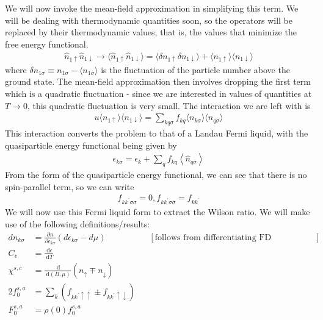 \documentclass[twoside,11pt]{report}
\numberwithin{equation}{section}
\begin{document}
We will now invoke the mean-field approximation in simplifying this term. We will be dealing with thermodynamic quantities soon, so the operators will be replaced by their thermodynamic values, that is, the values that minimize the free energy functional.
\begin{equation}\begin{aligned}
	\hat n_{1 \uparrow} \hat n_{1 \downarrow} \to \langle \hat n_{1 \uparrow} \hat n_{1 \downarrow}\rangle = \langle  \delta n_{1 \uparrow} \delta n_{1 \downarrow}\rangle + \langle  n_{1 \uparrow}\rangle\langle  n_{1 \downarrow}\rangle
\end{aligned}\end{equation}
where \(\delta n_{1\sigma} \equiv n_{1 \sigma} - \langle  n_{1\sigma} \rangle\) is the fluctuation of the particle number above the ground state. The mean-field approximation then involves dropping the first term which is a quadratic fluctuation - since we are interested in values of quantities at \( T \to 0\), this quadratic fluctuation is very small. The interaction we are left with is 
\begin{equation}\begin{aligned}
	u\langle  n_{1 \uparrow}\rangle\langle  n_{1 \downarrow}\rangle = \sum_{kq\sigma}f_{kq}\langle  n_{k \sigma}\rangle\langle  n_{q \overline\sigma}\rangle
\end{aligned}\end{equation}
This interaction converts the problem to that of a Landau Fermi liquid, with the quasiparticle energy functional being given by
\begin{equation}\begin{aligned}
	\epsilon_{k\sigma} = \epsilon_k + \sum_{q}f_{kq}\left<\hat n_{q \overline\sigma}\right>
\end{aligned}\end{equation}
From the form of the quasiparticle energy functional, we can see that there is no spin-parallel term, so we can write
\begin{equation}\begin{aligned}
	\label{rel_landau}
	f_{kk^\prime\sigma\sigma} = 0,  f_{kk^\prime\sigma\overline\sigma} = f_{kk^\prime}
\end{aligned}\end{equation}
We will now use this Fermi liquid form to extract the Wilson ratio. We will make use of the following definitions/results:
\begin{equation}\begin{aligned}
	dn_{k\sigma} &= \frac{\partial{n}}{\partial{\epsilon_{k\sigma}}}\left( d\epsilon_{k\sigma} - d\mu \right) &&\left[\text{follows from differentiating FD distribution}\right] \\
	C_v &= \frac{\:\mathrm{d}\epsilon}{\:\mathrm{d}T}\\
	\chi^{s,c} &= \frac{\:\mathrm{d}}{\:\mathrm{d}(B, \mu)}\left(n_\uparrow \mp n_\downarrow\right) \\
	2f_0^{s,a} &= \sum_k\left(f_{kk^\prime \uparrow \uparrow} \pm f_{kk^\prime \uparrow \downarrow}\right)\\
	F_0^{s,a} &= \rho(0) f_0^{s,a}
\end{aligned}\end{equation}
\end{document}
